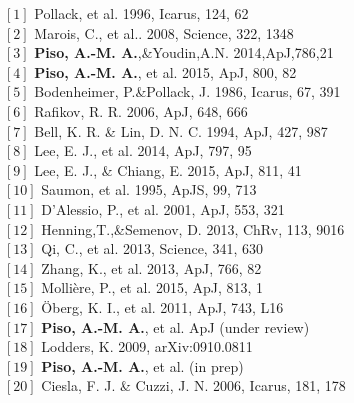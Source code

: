 \documentclass[12pt, letterpaper]{article}
\begin{document}
\begin{multicols}{2}
\noindent 
$[1]$ Pollack, et al. 1996, Icarus, 124, 62 \\
$[2]$ Marois, C.,  et al.. 2008, Science, 322, 1348 \\
$[3]$ \textbf{Piso, A.-M. A.},\&Youdin,A.N. 2014,ApJ,786,21 \\
$[4]$ \textbf{Piso, A.-M. A.}, et al. 2015, ApJ, 800, 82 \\
$[5]$ Bodenheimer, P.\&Pollack, J. 1986, Icarus, 67, 391 \\
$[6]$ Rafikov, R. R. 2006, ApJ, 648, 666 \\
$[7]$ Bell, K. R. \& Lin, D. N. C. 1994, ApJ, 427, 987 \\
$[8]$ Lee, E. J., et al. 2014, ApJ, 797, 95 \\ 
$[9]$ Lee, E. J., \& Chiang, E. 2015, ApJ, 811, 41 \\
$[10]$ Saumon, et al. 1995, ApJS, 99, 713 \\
$[11]$ D'Alessio, P., et al. 2001, ApJ, 553, 321 \\
$[12]$ Henning,T.,\&Semenov, D. 2013, ChRv, 113, 9016 \\
$[13]$ Qi, C., et al. 2013, Science, 341, 630 \\
$[14]$ Zhang, K., et al. 2013, ApJ, 766, 82 \\
$[15]$ Molli{\`e}re, P., et al. 2015, ApJ, 813, 1 \\
$[16]$ \"Oberg, K. I., et al. 2011, ApJ, 743, L16 \\
$[17]$ \textbf{Piso, A.-M. A.}, et al. ApJ (under review) \\
$[18]$ Lodders, K. 2009, arXiv:0910.0811 \\
$[19]$ \textbf{Piso, A.-M. A.}, et al. (in prep) \\
$[20]$ Ciesla, F. J. \& Cuzzi, J. N. 2006, Icarus, 181, 178



\end{multicols}

%
%


\end{document}
